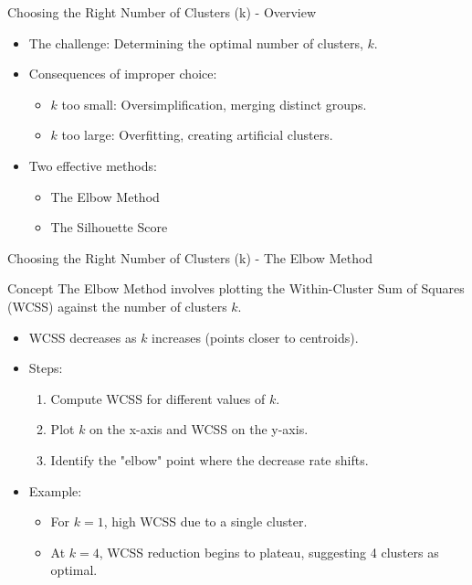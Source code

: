 \documentclass[aspectratio=169]{beamer}
\begin{document}
\begin{frame}[fragile]{Choosing the Right Number of Clusters (k) - Overview}
    \begin{itemize}
        \item The challenge: Determining the optimal number of clusters, \(k\).
        \item Consequences of improper choice:
        \begin{itemize}
            \item \(k\) too small: Oversimplification, merging distinct groups.
            \item \(k\) too large: Overfitting, creating artificial clusters.
        \end{itemize}
        \item Two effective methods:
        \begin{itemize}
            \item The Elbow Method
            \item The Silhouette Score
        \end{itemize}
    \end{itemize}
\end{frame}

\begin{frame}[fragile]{Choosing the Right Number of Clusters (k) - The Elbow Method}
    \begin{block}{Concept}
        The Elbow Method involves plotting the Within-Cluster Sum of Squares (WCSS) against the number of clusters \(k\).
    \end{block}
    
    \begin{itemize}
        \item WCSS decreases as \(k\) increases (points closer to centroids).
        \item Steps:
        \begin{enumerate}
            \item Compute WCSS for different values of \(k\).
            \item Plot \(k\) on the x-axis and WCSS on the y-axis.
            \item Identify the "elbow" point where the decrease rate shifts.
        \end{enumerate}
        \item Example:
        \begin{itemize}
            \item For \(k=1\), high WCSS due to a single cluster.
            \item At \(k=4\), WCSS reduction begins to plateau, suggesting 4 clusters as optimal.
        \end{itemize}
    \end{itemize}
\end{frame}
\end{document}
